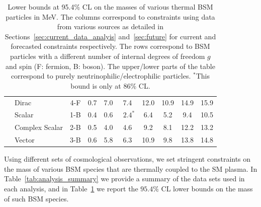 \begin{table}[t]
\begin{center}
{{\begin{tabular}{l|lc|ccccc|cc}
&Dirac   & 4-F  &  0.7 & 7.0 & 7.4 & 12.0 & 10.9  & 14.9  & 15.9\\  \cline{2-10} 

&Scalar  & 1-B  & 0.4 & 0.6  & $\>\>2.4^{*}$ & 6.4 & 5.2  & 9.4  & 10.5\\  \cline{2-10} 

&Complex Scalar   & 2-B  &  0.5 & 4.0 &  4.6 & 9.2 & 8.1  & 12.2  & 13.2\\  \cline{2-10} 

&Vector    & 3-B  & 0.6 & 5.8  & 6.3 & 10.9 & 9.8  & 13.8  & 14.8   \\ 
\hline \hline
\end{tabular}}
}
\end{center}
\vspace{-0.3cm}
\caption{Lower bounds at 95.4\% CL on the masses of various thermal BSM particles in MeV. The columns correspond to constraints using data from various sources as detailed in Sections~\ref{sec:current_data_analyis} and~\ref{sec:future} for current and forecasted constraints respectively. The rows correspond to BSM particles with a different number of internal degrees of freedom $g$ and spin (F: fermion, B: boson). The upper/lower parts of the table correspond to purely neutrinophilic/electrophilic particles. $^{*}$This bound is only at 86\% CL.}\label{tab:DMbounds}
\end{table}

Using different sets of cosmological observations, we set stringent constraints on the mass of various BSM species that are thermally coupled to the SM plasma. In Table~\ref{tab:analysis_summary} we provide a summary of the data sets used in each analysis, and in Table~\ref{tab:DMbounds} we report the $95.4\%$ CL lower bounds on the mass of such BSM species. 

